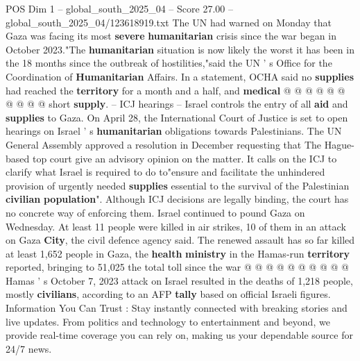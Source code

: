 \begin{textsample}{POS Dim 1 – global\_south\_2025\_04 – Score 27.00 – global\_south\_2025\_04/123618919.txt}
The UN had warned on Monday that Gaza was facing its most \textbf{severe} \textbf{humanitarian} crisis since the war began in October 2023."The \textbf{humanitarian} situation is now likely the worst it has been in the 18 months since the outbreak of hostilities,"said the UN ' s Office for the Coordination of \textbf{Humanitarian} Affairs.
In a statement, OCHA said no \textbf{supplies} had reached the \textbf{territory} for a month and a half, and \textbf{medical} @ @ @ @ @ @ @ @ @ @ short \textbf{supply}. -- ICJ hearings -- Israel controls the entry of all \textbf{aid} and \textbf{supplies} to Gaza.
On April 28, the International Court of Justice is set to open hearings on Israel ' s \textbf{humanitarian} obligations towards Palestinians.
The UN General Assembly approved a resolution in December requesting that The Hague-based top court give an advisory opinion on the matter.
It calls on the ICJ to clarify what Israel is required to do to"ensure and facilitate the unhindered provision of urgently needed \textbf{supplies} essential to the survival of the Palestinian \textbf{civilian} \textbf{population}".
Although ICJ decisions are legally binding, the court has no concrete way of enforcing them.
Israel continued to pound Gaza on Wednesday.
At least 11 people were killed in air strikes, 10 of them in an attack on Gaza \textbf{City}, the civil defence agency said.
The renewed assault has so far killed at least 1,652 people in Gaza, the \textbf{health} \textbf{ministry} in the Hamas-run \textbf{territory} reported, bringing to 51,025 the total toll since the war @ @ @ @ @ @ @ @ @ @ Hamas ' s October 7, 2023 attack on Israel resulted in the deaths of 1,218 people, mostly \textbf{civilians}, according to an AFP \textbf{tally} based on official Israeli figures.
Information You Can Trust : Stay instantly connected with breaking stories and live updates.
From politics and technology to entertainment and beyond, we provide real-time coverage you can rely on, making us your dependable source for 24/7 news.

\end{textsample}
